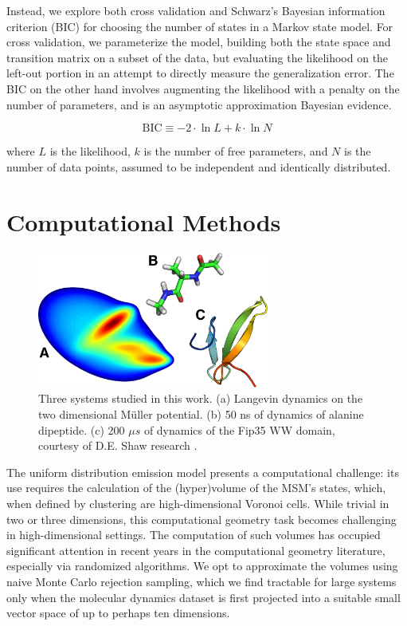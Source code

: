 \documentclass[twocolumn,floatfix,nofootinbib,aps]{revtex4-1}
\begin{document}
Instead, we explore both cross validation and Schwarz's Bayesian information criterion (BIC)\cite{Schwartz78Estimating} for choosing the number of states in a Markov state model. For cross validation, we parameterize the model, building both the state space and transition matrix on a subset of the data, but evaluating the likelihood on the left-out portion in an attempt to directly measure the generalization error. The BIC on the other hand involves augmenting the likelihood with a penalty on the number of parameters, and is
an asymptotic approximation Bayesian evidence.

\begin{equation}
\label{eq:bic}
\mathrm{BIC} \equiv -2\cdot \ln L + k \cdot \ln N
\end{equation}

where $L$ is the likelihood, $k$ is the number of free parameters, and $N$ is the number of data points, assumed to be independent and identically distributed.

\section{Computational Methods}

\begin{figure}
\centering
\includegraphics[width=3in]{figs/fig1_rbow.png}
\caption{Three systems studied in this work. (a) Langevin dynamics on the two dimensional M\"{u}ller potential. (b) 50 ns of dynamics of alanine dipeptide. (c) 200 $\mu s$ of dynamics of the Fip35 WW domain\cite{Liu2008Experimental}, courtesy of D.E. Shaw research \cite{}.}
\end{figure}

The uniform distribution emission model presents a computational challenge: its use requires the calculation of the (hyper)volume of the MSM's states, which, when defined by clustering are high-dimensional Voronoi cells. While trivial in two or three dimensions, this computational geometry task becomes challenging in high-dimensional settings. The computation of such volumes has occupied significant attention in recent years in the computational geometry literature, especially via randomized algorithms\cite{}. We opt to approximate the volumes using naive Monte Carlo rejection sampling, which we find tractable for large systems only when the molecular dynamics dataset is first projected into a suitable small vector space of up to perhaps ten dimensions.
\end{document}
